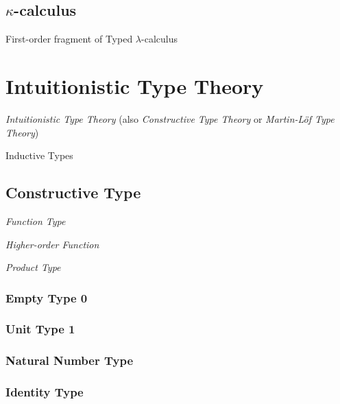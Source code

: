 \subsection{$\kappa$-calculus}\label{sec:kappa_calculus}

First-order fragment of Typed $\lambda$-calculus



\section{Intuitionistic Type Theory}\label{sec:intuitionistic_type}

\emph{Intuitionistic Type Theory} (also \emph{Constructive Type
  Theory} or \emph{Martin-L\"of Type Theory})

Inductive Types



\subsection{Constructive Type}\label{sec:constructive_type}

\emph{Function Type}

\emph{Higher-order Function}

\emph{Product Type}

\subsubsection{Empty Type $\mathbf{0}$}

\subsubsection{Unit Type $\mathbf{1}$}

\subsubsection{Natural Number Type}

\subsubsection{Identity Type}

